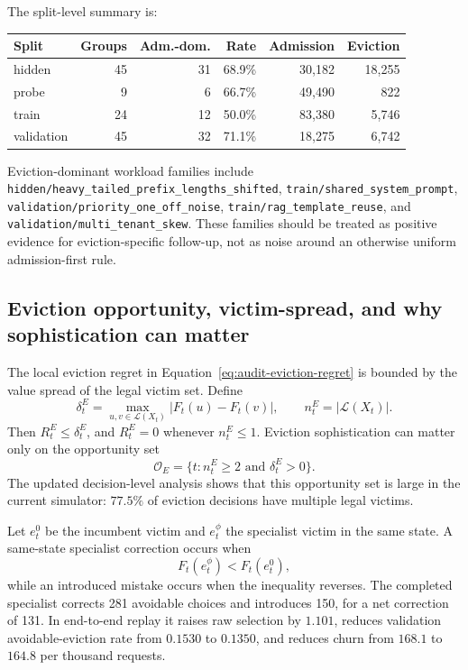 \documentclass[11pt]{article}
\newcommand{\identifier}[1]{\nolinkurl{#1}}
\begin{document}
The split-level summary is:
\begin{center}
\small
\begin{tabular}{lrrrrr}
\toprule
\textbf{Split} & \textbf{Groups} & \textbf{Adm.-dom.} & \textbf{Rate} &
\textbf{Admission} & \textbf{Eviction} \\
\midrule
hidden & 45 & 31 & 68.9\% & 30{,}182 & 18{,}255 \\
probe & 9 & 6 & 66.7\% & 49{,}490 & 822 \\
train & 24 & 12 & 50.0\% & 83{,}380 & 5{,}746 \\
validation & 45 & 32 & 71.1\% & 18{,}275 & 6{,}742 \\
\bottomrule
\end{tabular}
\end{center}

Eviction-dominant workload families include
\identifier{hidden/heavy\_tailed\_prefix\_lengths\_shifted},
\identifier{train/shared\_system\_prompt},
\identifier{validation/priority\_one\_off\_noise},
\identifier{train/rag\_template\_reuse}, and
\identifier{validation/multi\_tenant\_skew}.  These families should be treated as
positive evidence for eviction-specific follow-up, not as noise around an otherwise
uniform admission-first rule.

\subsection{Eviction opportunity, victim-spread, and why sophistication can matter}

The local eviction regret in Equation~\eqref{eq:audit-eviction-regret} is bounded by
the value spread of the legal victim set.  Define
\begin{equation}
  \delta^E_t=
  \max_{u,v\in\mathcal L(X_t)} |F_t(u)-F_t(v)|,
  \qquad
  n^E_t=|\mathcal L(X_t)|.
\end{equation}
Then \(R^E_t\le \delta^E_t\), and \(R^E_t=0\) whenever \(n^E_t\le 1\).  Eviction
sophistication can matter only on the opportunity set
\begin{equation}
  \mathcal O_E=\{t:n^E_t\ge 2\text{ and }\delta^E_t>0\}.
\end{equation}
The updated decision-level analysis shows that this opportunity set is large in the
current simulator: \(77.5\%\) of eviction decisions have multiple legal victims.

Let \(e^0_t\) be the incumbent victim and \(e^\phi_t\) the specialist victim in the
same state.  A same-state specialist correction occurs when
\begin{equation}
  F_t(e^\phi_t)<F_t(e^0_t),
\end{equation}
while an introduced mistake occurs when the inequality reverses.  The completed
specialist corrects 281 avoidable choices and introduces 150, for a net correction of
131.  In end-to-end replay it raises raw selection by \(1.101\), reduces validation
avoidable-eviction rate from \(0.1530\) to \(0.1350\), and reduces churn from
\(168.1\) to \(164.8\) per thousand requests.
\end{document}
